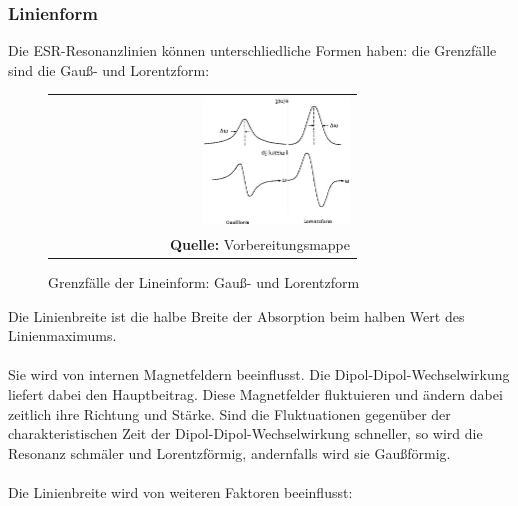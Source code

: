 \documentclass[a4paper,titlepage]{scrartcl}
\numberwithin{equation}{section}
\begin{document}
\subsubsection{Linienform}
Die ESR-Resonanzlinien können unterschliedliche Formen haben: die Grenzfälle sind die Gauß- und Lorentzform:
\begin{figure}[H]
	\centering
	\begin{tabular}{@{}r@{}}
		\includegraphics[width=0.5\textwidth]{linienform.png}\\
		\footnotesize\sffamily\textbf{Quelle:} Vorbereitungsmappe \cite{mappe}
	\end{tabular}
	\caption{Grenzfälle der Lineinform: Gauß- und Lorentzform}
    \label{fig:linienform}
\end{figure}
Die Linienbreite ist die halbe Breite der Absorption beim halben Wert des Linienmaximums.\\ \\
Sie wird von internen Magnetfeldern beeinflusst. Die Dipol-Dipol-Wechselwirkung liefert dabei den Hauptbeitrag. Diese Magnetfelder fluktuieren und ändern dabei zeitlich ihre Richtung und Stärke. Sind die Fluktuationen gegenüber der charakteristischen Zeit der Dipol-Dipol-Wechselwirkung schneller, so wird die Resonanz schmäler und Lorentzförmig, andernfalls wird sie Gaußförmig.\\ \\
Die Linienbreite wird von weiteren Faktoren beeinflusst:
\end{document}

